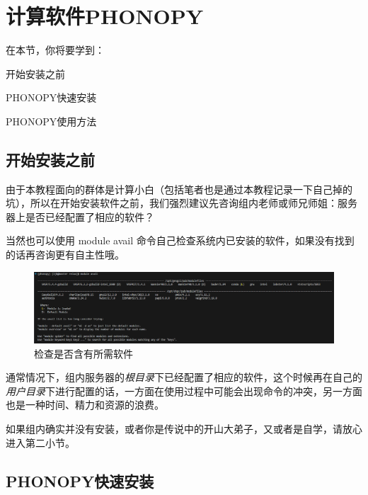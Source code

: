 \section{计算软件PHONOPY}\label{sec:计算软件PHONOPY}


在本节，你将要学到：
\begin{Abstract}
    \item 开始安装之前
    \item PHONOPY快速安装
    \item PHONOPY使用方法
\end{Abstract}

\subsection{开始安装之前}\label{sec:计算软件PHONOPY-开始安装之前}

由于本教程面向的群体是计算小白（包括笔者也是通过本教程记录一下自己掉的坑），所以在开始安装软件之前，我们强烈建议先咨询组内老师或师兄师姐：服务器上是否已经配置了相应的软件？

\begin{extend}
    当然也可以使用 module avail 命令自己检查系统内已安装的软件，如果没有找到的话再咨询更有自主性哦。
    \begin{figure}
        \centering
        \includegraphics[width=1\linewidth]{module-check.png}
        \caption{检查是否含有所需软件}
        \label{fig:检查软件}
    \end{figure}
\end{extend}

通常情况下，组内服务器的\emph{根目录}下已经配置了相应的软件，这个时候再在自己的\emph{用户目录}下进行配置的话，一方面在使用过程中可能会出现命令的冲突，另一方面也是一种时间、精力和资源的浪费。

如果组内确实并没有安装，或者你是传说中的开山大弟子，又或者是自学，请放心进入第二小节。

\subsection{PHONOPY快速安装}\label{sec:计算软件PHONOPY-PHONOPY快速安装}

